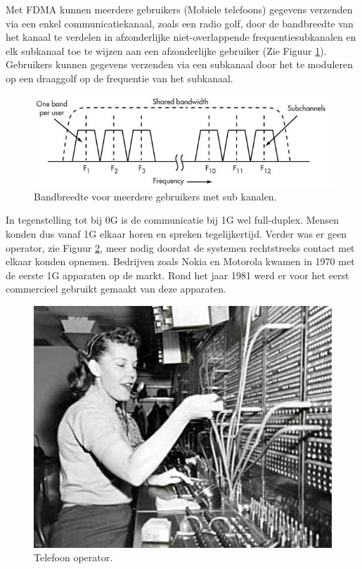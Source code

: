 \documentclass{article}
\begin{document}
\noindent Met FDMA kunnen meerdere gebruikers (Mobiele telefoons) gegevens verzenden via een enkel communicatiekanaal, zoals een radio golf, door de bandbreedte van het kanaal te verdelen in afzonderlijke niet-overlappende frequentiesubkanalen en elk subkanaal toe te wijzen aan een afzonderlijke gebruiker (Zie Figuur \ref{fig:fdma}). Gebruikers kunnen gegevens verzenden via een subkanaal door het te moduleren op een draaggolf op de frequentie van het subkanaal. \cite{FDMA} \\

\begin{figure}[H]
\centering
\includegraphics[width=0.9 \textwidth]{img/fdma.jpg}
\caption{Bandbreedte voor meerdere gebruikers met sub kanalen.}
\label{fig:fdma}
\end{figure}

\noindent In tegenstelling tot bij 0G is de communicatie bij 1G wel full-duplex. Mensen konden dus vanaf 1G elkaar horen en spreken tegelijkertijd. Verder was er geen operator, zie Figuur \ref{fig:operator}, meer nodig doordat de systemen rechtstreeks contact met elkaar konden opnemen. Bedrijven zoals Nokia en Motorola kwamen in 1970 met de eerste 1G apparaten op de markt. Rond het jaar 1981 werd er voor het eerst commercieel gebruikt gemaakt van deze apparaten. \cite{1G}

\begin{figure}[H]
\centering
\includegraphics[width=0.7 \textwidth]{img/operator.jpg}
\caption{Telefoon operator.}
\label{fig:operator}
\end{figure}
\end{document}
